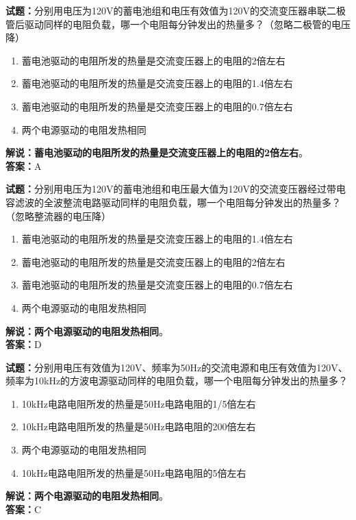 \documentclass{ctexbook}
\begin{document}
\vspace{1em}

\textbf{试题：}分别用电压为120V的蓄电池组和电压有效值为120V的交流变压器串联二极管后驱动同样的电阻负载，哪一个电阻每分钟发出的热量多？（忽略二极管的电压降）
\begin{enumerate}[leftmargin=3em]
  \item 蓄电池驱动的电阻所发的热量是交流变压器上的电阻的2倍左右
  \item 蓄电池驱动的电阻所发的热量是交流变压器上的电阻的1.4倍左右
  \item 蓄电池驱动的电阻所发的热量是交流变压器上的电阻的0.7倍左右
  \item 两个电源驱动的电阻发热相同
\end{enumerate}
\noindent\textbf{解说：}\textbf{蓄电池驱动的电阻所发的热量是交流变压器上的电阻的2倍左右}。\\\noindent\textbf{答案：}A

\vspace{1em}

\textbf{试题：}分别用电压为120V的蓄电池组和电压最大值为120V的交流变压器经过带电容滤波的全波整流电路驱动同样的电阻负载，哪一个电阻每分钟发出的热量多？（忽略整流器的电压降）
\begin{enumerate}[leftmargin=3em]
  \item 蓄电池驱动的电阻所发的热量是交流变压器上的电阻的1.4倍左右
  \item 蓄电池驱动的电阻所发的热量是交流变压器上的电阻的2倍左右
  \item 蓄电池驱动的电阻所发的热量是交流变压器上的电阻的0.7倍左右
  \item 两个电源驱动的电阻发热相同
\end{enumerate}
\noindent\textbf{解说：}\textbf{两个电源驱动的电阻发热相同}。\\\noindent\textbf{答案：}D

\vspace{1em}

\textbf{试题：}分别用电压有效值为120V、频率为50Hz的交流电源和电压有效值为120V、频率为10\unit{\kHz}的方波电源驱动同样的电阻负载，哪一个电阻每分钟发出的热量多？
\begin{enumerate}[leftmargin=3em]
  \item 10\unit{\kHz}电路电阻所发的热量是50Hz电路电阻的1/5倍左右
  \item 10\unit{\kHz}电路电阻所发的热量是50Hz电路电阻的200倍左右
  \item 两个电源驱动的电阻发热相同
  \item 10\unit{\kHz}电路电阻所发的热量是50Hz电路电阻的5倍左右
\end{enumerate}
\noindent\textbf{解说：}\textbf{两个电源驱动的电阻发热相同}。\\\noindent\textbf{答案：}C
\end{document}
